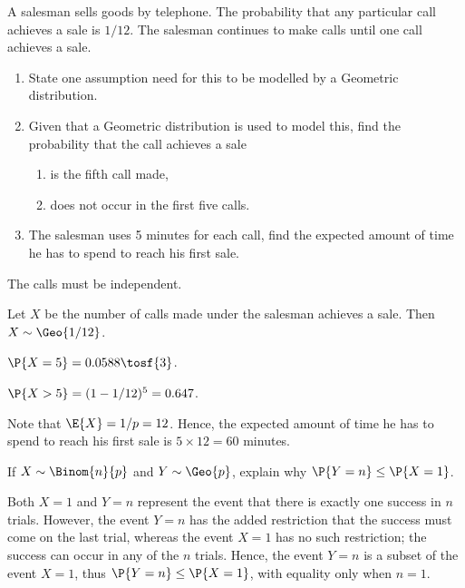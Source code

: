 \begin{problem}
    A salesman sells goods by telephone. The probability that any particular call achieves a sale is $1/12$. The salesman continues to make calls until one call achieves a sale.

    \begin{enumerate}
        \item State one assumption need for this to be modelled by a Geometric distribution.
        \item Given that a Geometric distribution is used to model this, find the probability that the call achieves a sale
        \begin{enumerate}
            \item is the fifth call made,
            \item does not occur in the first five calls.
        \end{enumerate}
        \item The salesman uses 5 minutes for each call, find the expected amount of time he has to spend to reach his first sale.
    \end{enumerate}
\end{problem}
\begin{solution}
    \begin{ppart}
        The calls must be independent.
    \end{ppart}
    \begin{ppart}
        Let $X$ be the number of calls made under the salesman achieves a sale. Then $X \sim \Geo{1/12}$.
        \begin{psubpart}
            $\P{X = 5} = 0.0588 \tosf{3}$.
        \end{psubpart}
        \begin{psubpart}
            $\P{X > 5} = (1 - 1/12)^5 = 0.647$.
        \end{psubpart}
    \end{ppart}
    \begin{ppart}
        Note that $\E{X} = 1/p = 12$. Hence, the expected amount of time he has to spend to reach his first sale is $5 \times 12 = 60$ minutes.
    \end{ppart}
\end{solution}

\begin{problem}
    If $X \sim \Binom{n}{p}$ and $Y \sim \Geo{p}$, explain why $\P{Y = n} \leq \P{X = 1}$.
\end{problem}
\begin{solution}
    Both $X = 1$ and $Y = n$ represent the event that there is exactly one success in $n$ trials. However, the event $Y = n$ has the added restriction that the success must come on the last trial, whereas the event $X = 1$ has no such restriction; the success can occur in any of the $n$ trials. Hence, the event $Y = n$ is a subset of the event $X = 1$, thus $\P{Y = n} \leq \P{X = 1}$, with equality only when $n = 1$.
\end{solution}


